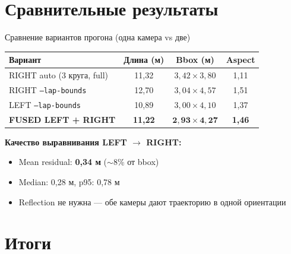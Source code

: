 \documentclass[aspectratio=169]{beamer}
\newcommand{\code}[1]{\texttt{#1}}
\begin{document}
\section{Сравнительные результаты}

\begin{frame}{Сравнение вариантов прогона (одна камера vs две)}
    \small
    \begin{table}
        \begin{tabular}{>{\raggedright\arraybackslash}p{} c c c}
            \toprule
            Вариант & Длина (м) & Bbox (м) & Aspect \\
            \midrule
            RIGHT auto (3 круга, full) & 11,32 & $3{,}42 \times 3{,}80$ & 1,11 \\
            RIGHT \code{--lap-bounds}  & 12,70 & $3{,}04 \times 4{,}57$ & 1,51 \\
            LEFT \code{--lap-bounds}   & 10,89 & $3{,}00 \times 4{,}10$ & 1,37 \\
            \textbf{FUSED LEFT + RIGHT} & \textbf{11,22} & $\mathbf{2{,}93 \times 4{,}27}$ & \textbf{1,46} \\
            \bottomrule
        \end{tabular}
    \end{table}

    \vspace{0.5em}
    \textbf{Качество выравнивания LEFT $\to$ RIGHT:}
    \begin{itemize}
        \item Mean residual: \textbf{0,34 м} ($\sim$8\% от bbox)
        \item Median: 0,28 м, p95: 0,78 м
        \item Reflection не нужна --- обе камеры дают траекторию в одной ориентации
    \end{itemize}
\end{frame}

\section{Итоги}
\end{document}
